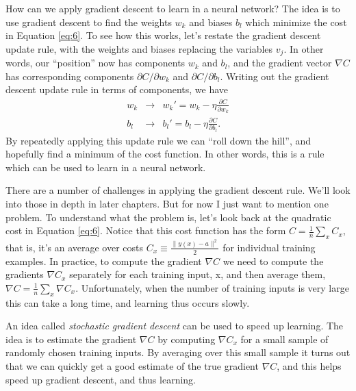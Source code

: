 \documentclass[a4paper,twoside,10pt]{book}
\begin{document}
How can we apply gradient descent to learn in a neural network? The idea is to use gradient descent to find the weights $w_k$ and biases $b_l$ which minimize the cost in Equation \ref{eq:6}. To see how this works, let's restate the gradient descent update rule, with the weights and biases replacing the variables $v_j$. In other words, our ``position'' now has components $w_k$ and $b_l$, and the gradient vector $\nabla C$ has corresponding components $\partial C/\partial w_k$ and $\partial C / \partial b_l$. Writing out the gradient descent update rule in terms of components, we have
\begin{eqnarray}
w_k & \to & w_k' = w_k-\eta \frac{\partial C}{\partial w_k}\\
b_l & \to & b_l' = b_l-\eta \frac{\partial C}{\partial b_l}.
\end{eqnarray}
By repeatedly applying this update rule we can ``roll down the hill'', and hopefully find a minimum of the cost function. In other words, this is a rule which can be used to learn in a neural network.

There are a number of challenges in applying the gradient descent rule. We'll look into those in depth in later chapters. But for now I just want to mention one problem. To understand what the problem is, let's look back at the quadratic cost in Equation \ref{eq:6}. Notice that this cost function has the form $C = \frac{1}{n} \sum_x C_x$, that is, it's an average over costs $C_x \equiv \frac{\|y(x)-a\|^2}{2}$ for individual training examples. In practice, to compute the gradient $\nabla C$ we need to  compute the gradients $\nabla C_x$ separately for each training input, x, and then average them, $\nabla C = \frac{1}{n}\sum_x \nabla C_x$. Unfortunately, when the number of training inputs is very large this can take a long time, and learning thus occurs slowly.

An idea called \textit{stochastic gradient descent} can be used to speed up learning. The idea is to estimate the gradient $\nabla C$ by computing $\nabla C_x$ for a small sample of randomly chosen training inputs. By averaging over this small sample it turns out that we can quickly get a good estimate of the true gradient $\nabla C$, and this helps speed up gradient descent, and thus learning.
\end{document}
